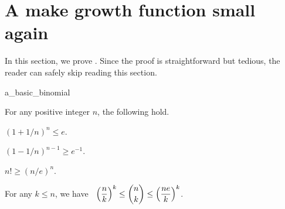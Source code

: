 \section{A make growth function small again}

In this section, we prove . Since the
proof is straightforward but tedious, the reader can safely skip
reading this section.

\begin{fragment}{a_basic_binomial}
    \begin{lemma}
        For any positive integer $n$, the following hold.
        \smallskip        
        \begin{compactenumi}
            \item $(1+1/n)^n \leq e$.

            \smallskip        
            \item $(1-1/n)^{n-1} \geq e^{-1}$.
            
            \smallskip        
            \item $n! \geq (n/e)^n$.
            
            \smallskip        
            \item  For any $k \leq n$, we have $\;\;\displaystyle
            \pth{\frac{n}{k}}^k \leq \binom{n}{k} \leq \pth{\frac{n
                  e}{k}}^k$.
        \end{compactenumi}
        
    \end{lemma}
\end{fragment}

